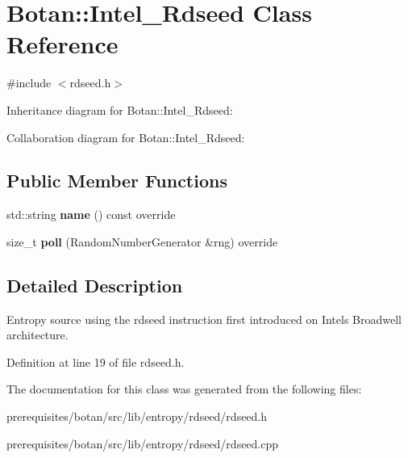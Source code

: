 \hypertarget{class_botan_1_1_intel___rdseed}{}\section{Botan\+:\+:Intel\+\_\+\+Rdseed Class Reference}
\label{class_botan_1_1_intel___rdseed}


{\ttfamily \#include $<$rdseed.\+h$>$}



Inheritance diagram for Botan\+:\+:Intel\+\_\+\+Rdseed\+:


Collaboration diagram for Botan\+:\+:Intel\+\_\+\+Rdseed\+:
\subsection*{Public Member Functions}
\begin{DoxyCompactItemize}
\item 
\mbox{\label{class_botan_1_1_intel___rdseed_a244ad1d185835d50840891fa15274a35}} 
std\+::string {\bfseries name} () const override
\item 
\mbox{\label{class_botan_1_1_intel___rdseed_ace7f19561a8ea579f5ee640574e8f6e8}} 
size\+\_\+t {\bfseries poll} (Random\+Number\+Generator \&rng) override
\end{DoxyCompactItemize}


\subsection{Detailed Description}
Entropy source using the rdseed instruction first introduced on Intel\textquotesingle{}s Broadwell architecture. 

Definition at line 19 of file rdseed.\+h.



The documentation for this class was generated from the following files\+:\begin{DoxyCompactItemize}
\item 
prerequisites/botan/src/lib/entropy/rdseed/rdseed.\+h\item 
prerequisites/botan/src/lib/entropy/rdseed/rdseed.\+cpp\end{DoxyCompactItemize}
